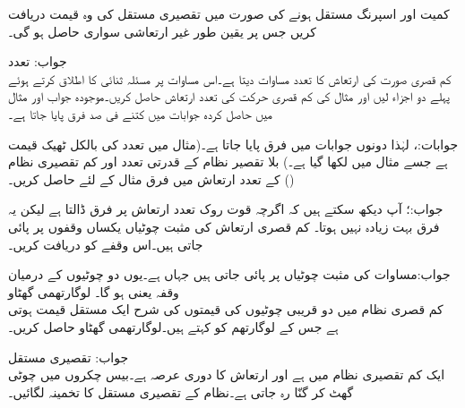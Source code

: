 کمیت  اور اسپرنگ مستقل  ہونے کی صورت میں تقصیری مستقل کی وہ قیمت دریافت کریں جس پر یقین طور غیر ارتعاشی سواری حاصل ہو گی۔

  جواب:
\quad تعدد\\
کم قصری صورت کی ارتعاش کا تعدد   مساوات  دیتا ہے۔اس مساوات پر مسئلہ ثنائی کا اطلاق کرتے ہوئے پہلے دو اجزاء لیں اور  مثال  کی کم قصری حرکت  کی تعدد ارتعاش حاصل کریں۔موجودہ جواب اور مثال میں حاصل کردہ جوابات میں کتنے فی صد فرق پایا جاتا ہے۔

جوابات:،  لہٰذا دونوں جوابات میں  فرق پایا جاتا ہے۔(مثال  میں تعدد کی بالکل ٹھیک قیمت  ہے جسے مثال میں  لکھا گیا ہے۔)
بلا تقصیر نظام کے قدرتی تعدد اور کم تقصیری نظام () کے تعدد ارتعاش میں فرق مثال  کے لئے حاصل کریں۔

جواب:؛ آپ دیکھ سکتے ہیں کہ اگرچہ قوت روک تعدد ارتعاش پر فرق ڈالتا ہے لیکن یہ فرق بہت زیادہ نہیں ہوتا۔
کم قصری ارتعاش کی مثبت چوٹیاں یکساں وقفوں پر پائی جاتی ہیں۔اس وقفے کو دریافت کریں۔ 

جواب:مساوات  کی مثبت چوٹیاں  پر پائی جاتی ہیں جہاں  ہے۔یوں دو چوٹیوں کے درمیان وقفہ  یعنی  ہو گا۔
\quad لوگارتھمی گھٹاو\\
کم قصری نظام میں  دو قریبی چوٹیوں کی قیمتوں کی شرح ایک مستقل قیمت ہوتی ہے جس کے لوگارتھم کو  کہتے ہیں۔لوگارتھمی گھٹاو  حاصل کریں۔ 

جواب:
\quad تقصیری مستقل\\
ایک کم تقصیری نظام میں  ہے اور ارتعاش کا دوری عرصہ  ہے۔بیس چکروں میں چوٹی گھٹ کر  گنّا رہ جاتی ہے۔نظام کے تقصیری مستقل کا تخمینہ لگائیں۔


